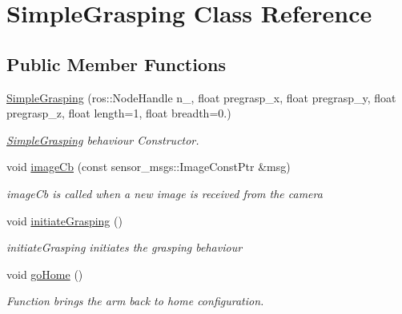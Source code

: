 \hypertarget{class_simple_grasping}{\section{Simple\-Grasping Class Reference}
\label{class_simple_grasping}
}
\subsection*{Public Member Functions}
\begin{DoxyCompactItemize}
\item 
\hyperlink{class_simple_grasping_a2378696c46e6f023d5032919b1af8fad}{Simple\-Grasping} (ros\-::\-Node\-Handle n\-\_\-, float pregrasp\-\_\-x, float pregrasp\-\_\-y, float pregrasp\-\_\-z, float length=1, float breadth=0.)
\begin{DoxyCompactList}\small\item\em \hyperlink{class_simple_grasping}{Simple\-Grasping} behaviour Constructor. \end{DoxyCompactList}\item 
void \hyperlink{class_simple_grasping_a133954726ab489d9c5d7c20b4504eb82}{image\-Cb} (const sensor\-\_\-msgs\-::\-Image\-Const\-Ptr \&msg)
\begin{DoxyCompactList}\small\item\em image\-Cb is called when a new image is received from the camera \end{DoxyCompactList}\item 
\hypertarget{class_simple_grasping_adb6d0c8e6d4f0668c212181bb82cf8ff}{void \hyperlink{class_simple_grasping_adb6d0c8e6d4f0668c212181bb82cf8ff}{initiate\-Grasping} ()}\label{class_simple_grasping_adb6d0c8e6d4f0668c212181bb82cf8ff}

\begin{DoxyCompactList}\small\item\em initiate\-Grasping initiates the grasping behaviour \end{DoxyCompactList}\item 
\hypertarget{class_simple_grasping_a771b6bba25730dbaf2ff72a4bd6938a1}{void \hyperlink{class_simple_grasping_a771b6bba25730dbaf2ff72a4bd6938a1}{go\-Home} ()}\label{class_simple_grasping_a771b6bba25730dbaf2ff72a4bd6938a1}

\begin{DoxyCompactList}\small\item\em Function brings the arm back to home configuration. \end{DoxyCompactList}\end{DoxyCompactItemize}


